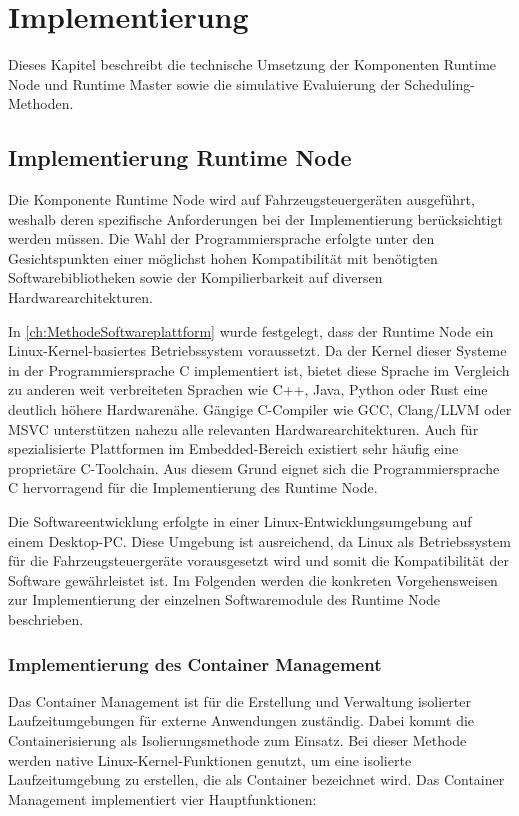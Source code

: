 \chapter{Implementierung}
\label{ch:Implementierung}

Dieses Kapitel beschreibt die technische Umsetzung der Komponenten Runtime Node und Runtime Master sowie die simulative Evaluierung der Scheduling-Methoden.

\section{Implementierung Runtime Node}
\label{sec:ImplementierungRuntimeNode}

Die Komponente Runtime Node wird auf Fahrzeugsteuergeräten ausgeführt, weshalb deren spezifische Anforderungen bei der Implementierung berücksichtigt werden müssen. Die Wahl der Programmiersprache erfolgte unter den Gesichtspunkten einer möglichst hohen Kompatibilität mit benötigten Softwarebibliotheken sowie der Kompilierbarkeit auf diversen Hardwarearchitekturen. 

In \autoref{ch:MethodeSoftwareplattform} wurde festgelegt, dass der Runtime Node ein Linux-Kernel-basiertes Betriebssystem voraussetzt. Da der Kernel dieser Systeme in der Programmiersprache C implementiert ist, bietet diese Sprache im Vergleich zu anderen weit verbreiteten Sprachen wie C++, Java, Python oder Rust eine deutlich höhere Hardwarenähe. Gängige C-Compiler wie GCC, Clang/LLVM oder MSVC unterstützen nahezu alle relevanten Hardwarearchitekturen. Auch für spezialisierte Plattformen im Embedded-Bereich existiert sehr häufig eine proprietäre C-Toolchain. Aus diesem Grund eignet sich die Programmiersprache C hervorragend für die Implementierung des Runtime Node. 

Die Softwareentwicklung erfolgte in einer Linux-Entwicklungsumgebung auf einem Desktop-PC. Diese Umgebung ist ausreichend, da Linux als Betriebssystem für die Fahrzeugsteuergeräte vorausgesetzt wird und somit die Kompatibilität der Software gewährleistet ist. Im Folgenden werden die konkreten Vorgehensweisen zur Implementierung der einzelnen Softwaremodule des Runtime Node beschrieben.

\subsection{Implementierung des Container Management}
\label{sec:ContainerManagement}

Das Container Management ist für die Erstellung und Verwaltung isolierter Laufzeitumgebungen für externe Anwendungen zuständig. Dabei kommt die Containerisierung als Isolierungsmethode zum Einsatz. Bei dieser Methode werden native Linux-Kernel-Funktionen genutzt, um eine isolierte Laufzeitumgebung zu erstellen, die als Container bezeichnet wird. Das Container Management implementiert vier Hauptfunktionen:

